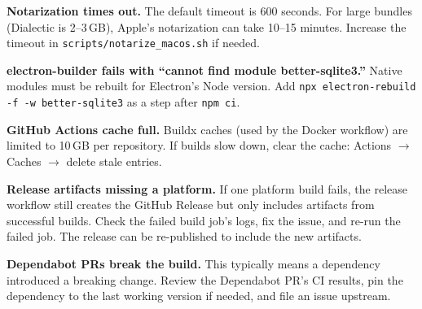 \documentclass[11pt,letterpaper]{article}
\newcommand{\file}[1]{\texttt{#1}}
\newcommand{\cmd}[1]{\texttt{#1}}
\begin{document}
\textbf{Notarization times out.} The default timeout is 600 seconds. For large bundles (Dialectic is 2--3\,GB), Apple's notarization can take 10--15 minutes. Increase the timeout in \file{scripts/notarize\_macos.sh} if needed.

\textbf{electron-builder fails with ``cannot find module better-sqlite3.''} Native modules must be rebuilt for Electron's Node version. Add \cmd{npx electron-rebuild -f -w better-sqlite3} as a step after \cmd{npm ci}.

\textbf{GitHub Actions cache full.} Buildx caches (used by the Docker workflow) are limited to 10\,GB per repository. If builds slow down, clear the cache: Actions $\to$ Caches $\to$ delete stale entries.

\textbf{Release artifacts missing a platform.} If one platform build fails, the release workflow still creates the GitHub Release but only includes artifacts from successful builds. Check the failed build job's logs, fix the issue, and re-run the failed job. The release can be re-published to include the new artifacts.

\textbf{Dependabot PRs break the build.} This typically means a dependency introduced a breaking change. Review the Dependabot PR's CI results, pin the dependency to the last working version if needed, and file an issue upstream.
\end{document}
